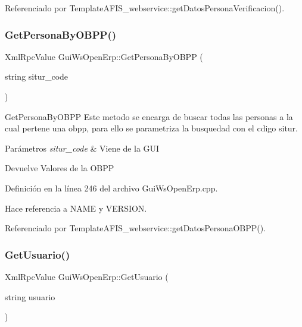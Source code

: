 Referenciado por Template\+A\+F\+I\+S\+\_\+webservice\+::get\+Datos\+Persona\+Verificacion().

\hypertarget{classGuiWsOpenErp_aeb56055280e6dcceb9b3da722c20a5ce}{}\label{classGuiWsOpenErp_aeb56055280e6dcceb9b3da722c20a5ce} 
\subsubsection{\texorpdfstring{Get\+Persona\+By\+O\+B\+P\+P()}{GetPersonaByOBPP()}}
{\footnotesize\ttfamily Xml\+Rpc\+Value Gui\+Ws\+Open\+Erp\+::\+Get\+Persona\+By\+O\+B\+PP (\begin{DoxyParamCaption}\item[{string}]{situr\+\_\+code }\end{DoxyParamCaption})\hspace{0.3cm}{\ttfamily [inline]}}



Get\+Persona\+By\+O\+B\+PP Este metodo se encarga de buscar todas las personas a la cual pertene una obpp, para ello se parametriza la busquedad con el cdigo situr. 


\begin{DoxyParams}{Parámetros}
{\em situr\+\_\+code} & Viene de la G\+UI \\
\hline
\end{DoxyParams}
\begin{DoxyReturn}{Devuelve}
Valores de la O\+B\+PP 
\end{DoxyReturn}


Definición en la línea 246 del archivo Gui\+Ws\+Open\+Erp.\+cpp.



Hace referencia a N\+A\+ME y V\+E\+R\+S\+I\+ON.



Referenciado por Template\+A\+F\+I\+S\+\_\+webservice\+::get\+Datos\+Persona\+O\+B\+P\+P().

\hypertarget{classGuiWsOpenErp_a417ed5728168fa74561efd022a42ae49}{}\label{classGuiWsOpenErp_a417ed5728168fa74561efd022a42ae49} 
\subsubsection{\texorpdfstring{Get\+Usuario()}{GetUsuario()}}
{\footnotesize\ttfamily Xml\+Rpc\+Value Gui\+Ws\+Open\+Erp\+::\+Get\+Usuario (\begin{DoxyParamCaption}\item[{string}]{usuario }\end{DoxyParamCaption})\hspace{0.3cm}{\ttfamily [inline]}}



